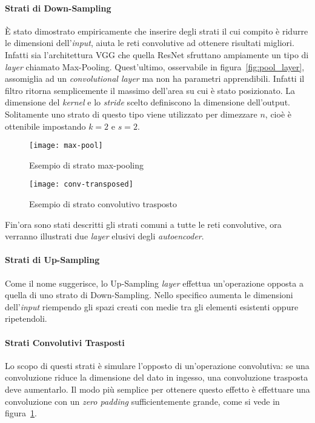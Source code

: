 \paragraph{Strati di Down-Sampling}
È stato dimostrato empiricamente che inserire degli strati il cui compito è ridurre le dimensioni dell'\textit{input}, aiuta le reti convolutive ad ottenere risultati migliori.
Infatti sia l'architettura VGG che quella ResNet sfruttano ampiamente un tipo di \textit{layer} chiamato Max-Pooling.
Quest'ultimo, osservabile in figura~\ref{fig:pool_layer}, assomiglia ad un \textit{convolutional layer} ma non ha parametri apprendibili.
Infatti il filtro ritorna semplicemente il massimo dell'area su cui è stato posizionato.
La dimensione del \textit{kernel} e lo \textit{stride} scelto definiscono la dimensione dell'output.
Solitamente uno strato di questo tipo viene utilizzato per dimezzare $n$, cioè è ottenibile impostando $k=2$ e $s=2$.

\begin{figure}
\centering
\begin{minipage}{.65\textwidth}
  \centering
  \texttt{[image: max-pool]}
    \caption{Esempio di strato max-pooling}
    \label{fig:pool_layer}
\end{minipage}%
\begin{minipage}{.35\textwidth}
  \centering
  \texttt{[image: conv-transposed]}
    \caption{Esempio di strato convolutivo trasposto}
    \label{fig:conv-transposed}
\end{minipage}
\end{figure}

Fin'ora sono stati descritti gli strati comuni a tutte le reti convolutive, ora verranno illustrati due \textit{layer} elusivi degli \textit{autoencoder}.

\paragraph{Strati di Up-Sampling}
Come il nome suggerisce, lo Up-Sampling \textit{layer} effettua un'operazione opposta a quella di uno strato di Down-Sampling.
Nello specifico aumenta le dimensioni dell'\textit{input} riempendo gli spazi creati con medie tra gli elementi esistenti oppure ripetendoli.

\paragraph{Strati Convolutivi Trasposti}
Lo scopo di questi strati è simulare l'opposto di un'operazione convolutiva: se una convoluzione riduce la dimensione del dato in ingesso, una convoluzione trasposta deve aumentarlo.
Il modo più semplice per ottenere questo effetto è effettuare una convoluzione con un \textit{zero padding} sufficientemente grande, come si vede in figura~\ref{fig:conv-transposed}.


